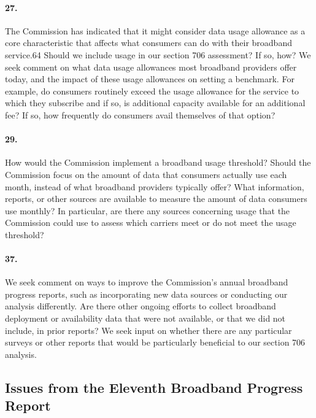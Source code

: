 \paragraph{27. } The Commission has indicated that it might consider data usage allowance as a core characteristic that affects what consumers can do with their broadband service.64
Should we include
usage in our section 706 assessment? If so, how? We seek comment on what data usage allowances most broadband providers offer today, and the impact of these usage allowances on setting a benchmark. For example, do consumers routinely exceed the usage allowance for the service to which they subscribe and if so, is additional capacity available for an additional fee? If so, how frequently do consumers avail themselves of that option?

\paragraph{29. }How would the Commission implement a broadband usage threshold? Should the Commission focus on the amount of data that consumers actually use each month, instead of what broadband providers typically offer? What information, reports, or other sources are available to measure the amount of data consumers use monthly? In particular, are there any sources concerning usage that the Commission could use to assess which carriers meet or do not meet the usage threshold?

\paragraph{37. }
We seek comment on ways to improve the Commission’s annual broadband progress reports, such as incorporating new data sources or conducting our analysis differently. Are there other ongoing efforts to collect broadband deployment or availability data that were not available, or that we did not include, in prior reports? We seek input on whether there are any particular surveys or other reports that would be particularly beneficial to our section 706 analysis.


\subsection{Issues from the Eleventh Broadband Progress Report}
\label{subsec:fcc2015}

